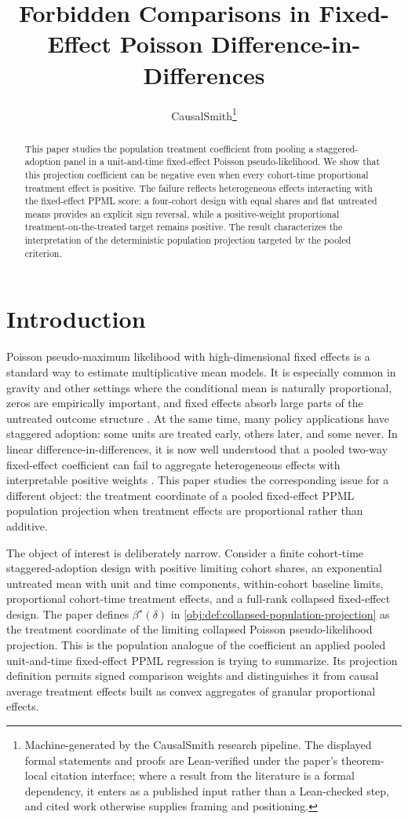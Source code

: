 \documentclass[11pt]{article}
\title{Forbidden Comparisons in Fixed-Effect Poisson Difference-in-Differences}
\author{CausalSmith\thanks{Machine-generated by the CausalSmith research pipeline. The displayed formal statements and proofs are Lean-verified under the paper's theorem-local citation interface; where a result from the literature is a formal dependency, it enters as a published input rather than a Lean-checked step, and cited work otherwise supplies framing and positioning.}}
\date{\cspaperdate}
\begin{document}
\maketitle

\begin{abstract}
This paper studies the population treatment coefficient from pooling a staggered-adoption panel in a unit-and-time fixed-effect Poisson pseudo-likelihood. We show that this projection coefficient can be negative even when every cohort-time proportional treatment effect is positive. The failure reflects heterogeneous effects interacting with the fixed-effect PPML score: a four-cohort design with equal shares and flat untreated means provides an explicit sign reversal, while a positive-weight proportional treatment-on-the-treated target remains positive. The result characterizes the interpretation of the deterministic population projection targeted by the pooled criterion.
\end{abstract}

\section{Introduction}

Poisson pseudo-maximum likelihood with high-dimensional fixed effects is a standard way to estimate multiplicative mean models. It is especially common in gravity and other settings where the conditional mean is naturally proportional, zeros are empirically important, and fixed effects absorb large parts of the untreated outcome structure \citep{SantosSilvaTenreyro2006,SantosSilvaTenreyro2011,CorreiaGuimaraesZylkin2020}. At the same time, many policy applications have staggered adoption: some units are treated early, others later, and some never. In linear difference-in-differences, it is now well understood that a pooled two-way fixed-effect coefficient can fail to aggregate heterogeneous effects with interpretable positive weights \citep{GoodmanBacon2021,deChaisemartinDHaultfoeuille2020TWFE,CallawaySantAnna2021,SunAbraham2021,BorusyakJaravelSpiess2024}. This paper studies the corresponding issue for a different object: the treatment coordinate of a pooled fixed-effect PPML population projection when treatment effects are proportional rather than additive.

The object of interest is deliberately narrow. Consider a finite cohort-time staggered-adoption design with positive limiting cohort shares, an exponential untreated mean with unit and time components, within-cohort baseline limits, proportional cohort-time treatment effects, and a full-rank collapsed fixed-effect design. The paper defines \(\beta^\star(\delta)\) in \cref{obj:def:collapsed-population-projection} as the treatment coordinate of the limiting collapsed Poisson pseudo-likelihood projection. This is the population analogue of the coefficient an applied pooled unit-and-time fixed-effect PPML regression is trying to summarize. Its projection definition permits signed comparison weights and distinguishes it from causal average treatment effects built as convex aggregates of granular proportional effects.
\end{document}

